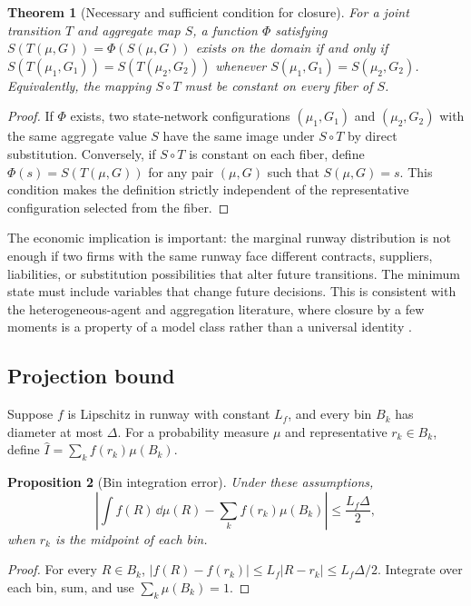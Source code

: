 \documentclass[11pt,a4paper]{article}
\newtheorem{theorem}{Theorem}[section]\newtheorem{proposition}[theorem]{Proposition}\newtheorem{corollary}[theorem]{Corollary}\newtheorem{definition}[theorem]{Definition}\newtheorem{assumption}[theorem]{Assumption}
\begin{document}
\begin{theorem}[Necessary and sufficient condition for closure]
For a joint transition $T$ and aggregate map $S$, a function $\Phi$ satisfying $S(T(\mu, G)) = \Phi(S(\mu, G))$ exists on the domain if and only if $S(T(\mu_1, G_1)) = S(T(\mu_2, G_2))$ whenever $S(\mu_1, G_1) = S(\mu_2, G_2)$. Equivalently, the mapping $S \circ T$ must be constant on every fiber of $S$.
\end{theorem}
\begin{proof}
If $\Phi$ exists, two state-network configurations $(\mu_1, G_1)$ and $(\mu_2, G_2)$ with the same aggregate value $S$ have the same image under $S \circ T$ by direct substitution. Conversely, if $S \circ T$ is constant on each fiber, define $\Phi(s) = S(T(\mu, G))$ for any pair $(\mu, G)$ such that $S(\mu, G) = s$. This condition makes the definition strictly independent of the representative configuration selected from the fiber.
\end{proof}

The economic implication is important: the marginal runway distribution is not enough if two firms with the same runway face different contracts, suppliers, liabilities, or substitution possibilities that alter future transitions. The minimum state must include variables that change future decisions. This is consistent with the heterogeneous-agent and aggregation literature, where closure by a few moments is a property of a model class rather than a universal identity \citep{krusell1998,achdou2022}.

\subsection{Projection bound}
Suppose $f$ is Lipschitz in runway with constant $L_f$, and every bin $B_k$ has diameter at most $\Delta$. For a probability measure $\mu$ and representative $r_k\in B_k$, define $\widehat I=\sum_k f(r_k)\mu(B_k)$.
\begin{proposition}[Bin integration error]
Under these assumptions,
\begin{equation}
\left|\int f(R)\,\dd\mu(R)-\sum_k f(r_k)\mu(B_k)\right|\leq\frac{L_f\Delta}{2}, \label{eq:binbound}
\end{equation}
when $r_k$ is the midpoint of each bin.
\end{proposition}
\begin{proof}
For every $R\in B_k$, $|f(R)-f(r_k)|\leq L_f|R-r_k|\leq L_f\Delta/2$. Integrate over each bin, sum, and use $\sum_k\mu(B_k)=1$.\end{proof}
\end{document}
